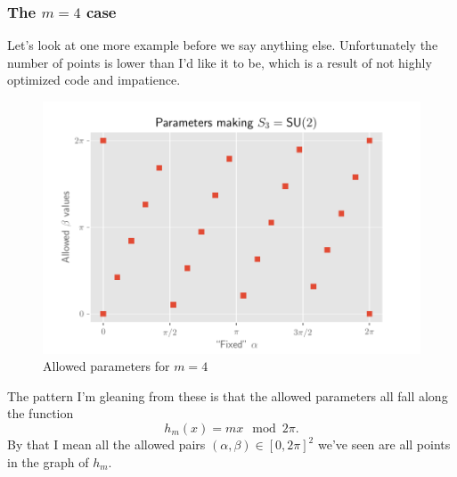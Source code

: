 \documentclass[12pt,dvipsnames]{article}
\newcommand{\1}{\mathbb{1}}
\theoremstyle{plain}
\begin{document}
\subsubsection{The $m = 4$ case}
Let's look at one more example before we say anything else. Unfortunately the number of points is lower than I'd like it to be, which is a result of not highly optimized code and impatience.
\begin{figure}[h]
    \begin{minipage}[c]{0.7\textwidth}
        \includegraphics[width=\textwidth]{../su2/s3.pdf}
    \end{minipage}\hfill
    \begin{minipage}[c]{0.3\textwidth}
        \caption{Allowed parameters for $m = 4$}\label{fig:m=4}
    \end{minipage}
\end{figure}

The pattern I'm gleaning from these is that the allowed parameters all fall along the function
\begin{equation}
    h_m(x) = mx \mod 2\pi.
\end{equation}
By that I mean all the allowed pairs $(\alpha, \beta)\in[0, 2\pi]^2$ we've seen are all points in the graph of $h_m$.
\end{document}
